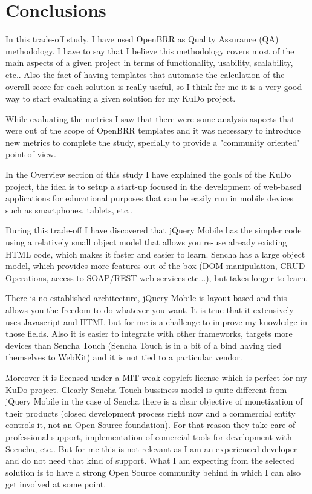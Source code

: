 \documentclass[a4paper,12pt]{book}
\begin{document}

\chapter{Conclusions}
\label{chap:conclusions}

In this trade-off study, I have used OpenBRR as Quality Assurance (QA) methodology. I have to say that I believe this methodology covers most of the main aspects of a given project in terms of functionality, usability, scalability, etc.. Also the fact of having templates that automate the calculation of the overall score for each solution is really useful, so I think for me it is a very good way to start evaluating a given solution for my KuDo project.

While evaluating the metrics I saw that there were some analysis aspects that were out of the scope of OpenBRR templates and it was necessary to introduce new metrics to complete the study, specially to provide a "community oriented" point of view.

In the Overview section of this study I have explained the goals of the KuDo project, the idea is to setup a start-up focused in the development of web-based applications for educational purposes that can be easily run in mobile devices such as smartphones, tablets, etc..

During this trade-off I have discovered that jQuery Mobile has the simpler code using a relatively small object model that allows you re-use already existing HTML code, which makes it faster and easier to learn. Sencha has a large object model, which provides more features out of the box (DOM manipulation, CRUD Operations, access to SOAP/REST web services etc...), but takes longer to learn.

There is no established architecture, jQuery Mobile is layout-based and this allows you the freedom to do whatever you want. It is true that it extensively uses Javascript and HTML but for me is a challenge to improve my knowledge in those fields. Also it is easier to integrate with other frameworks, targets more devices than Sencha Touch (Sencha Touch is in a bit of a bind having tied themselves to WebKit) and it is not tied to a particular vendor.

Moreover it is licensed under a MIT weak copyleft license which is perfect for my KuDo project. Clearly Sencha Touch bussiness model is quite different from jQuery Mobile in the case of Sencha there is a clear objective of monetization of their products (closed development process right now and a commercial entity controls it, not an Open Source foundation). For that reason they take care of professional support, implementation of comercial tools for development with Secncha, etc.. But for me this is not relevant as I am an experienced developer and do not need that kind of support. What I am expecting from the selected solution is to have a strong Open Source community behind in which I can also get involved at some point.
\end{document}
